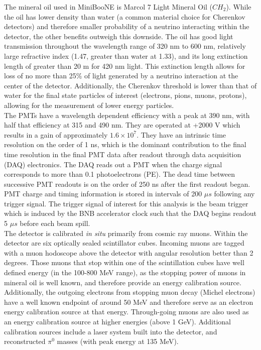 The mineral oil used in MiniBooNE is Marcol 7 Light Mineral Oil ($CH_2$). While the oil has lower density than water (a common material choice for Cherenkov detectors) and therefore smaller probability of a neutrino interacting within the detector, the other benefits outweigh this downside. The oil has good light transmission throughout the wavelength range of 320 nm to 600 nm, relatively large refractive index (1.47, greater than water at 1.33), and its long extinction length of greater than 20 m for 420 nm light. This extinction length allows for loss of no more than 25\% of light generated by a neutrino interaction at the center of the detector. Additionally, the Cherenkov threshold is lower than that of water for the final state particles of interest (electrons, pions, muons, protons), allowing for the measurement of lower energy particles.\\

The PMTs have a wavelength dependent efficiency with a peak at 390 nm, with half that efficiency at 315 and 490 nm. They are operated at +2000 V which results in a gain of approximately $1.6 \times 10^7$. They have an intrinsic time resolution on the order of 1 ns, which is the dominant contribution to the final time resolution in the final PMT data after readout through data acquisition (DAQ) electronics. The DAQ reads out a PMT when the charge signal corresponds to more than 0.1 photoelectrons (PE). The dead time between successive PMT readouts is on the order of 250 ns after the first readout began. PMT charge and timing information is stored in intervals of 200 $\mu s$ following any trigger signal. The trigger signal of interest for this analysis is the beam trigger which is induced by the BNB accelerator clock such that the DAQ begins readout 5 $\mu s$ before each beam spill.\\

The detector is calibrated \textit{in situ} primarily from cosmic ray muons. Within the detector are six optically sealed scintillator cubes. Incoming muons are tagged with a muon hodoscope above the detector with angular resolution better than 2 degrees. Those muons that stop within one of the scintillation cubes have well defined energy (in the 100-800 MeV range), as the stopping power of muons in mineral oil is well known, and therefore provide an energy calibration source. Additionally, the outgoing electrons from stopping muon decay (Michel electrons) have a well known endpoint of around 50 MeV and therefore serve as an electron energy calibration source at that energy. Through-going muons are also used as an energy calibration source at higher energies (above 1 GeV). Additional calibration sources include a laser system built into the detector, and reconstructed $\pi^0$ masses (with peak energy at 135 MeV).

